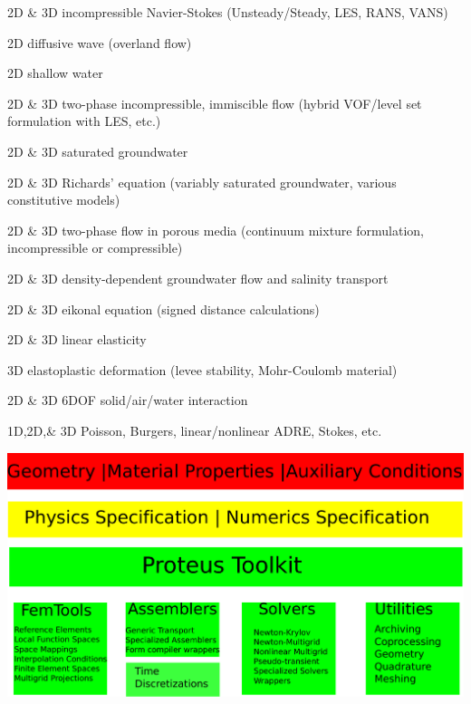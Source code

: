 \documentclass{beamer}
\begin{document}
\begin{frame}
\bit
\footnotesize
\item 2D \& 3D incompressible Navier-Stokes (Unsteady/Steady, LES,
  RANS, VANS)
\item 2D diffusive wave (overland flow)
\item 2D shallow water
\item 2D \& 3D two-phase incompressible, immiscible flow (hybrid
  VOF/level set formulation with LES, etc.)
\item 2D \& 3D saturated groundwater
\item 2D \& 3D Richards' equation (variably saturated groundwater,
  various constitutive models)
\item 2D \& 3D two-phase flow in porous media (continuum mixture
  formulation, incompressible or compressible)
\item 2D \& 3D density-dependent groundwater flow and salinity
  transport
\item 2D \& 3D eikonal equation (signed distance calculations)
\item 2D \& 3D linear elasticity
\item 3D elastoplastic deformation (levee stability, Mohr-Coulomb material)
\item 2D \& 3D 6DOF solid/air/water interaction
\item 1D,2D,\& 3D Poisson, Burgers, linear/nonlinear ADRE, Stokes,
  etc.  \eit
\end{frame}

\begin{frame}
\begin{center}
\includegraphics[scale=0.4]{modules.pdf}
\end{center}
\end{frame}
\end{document}
